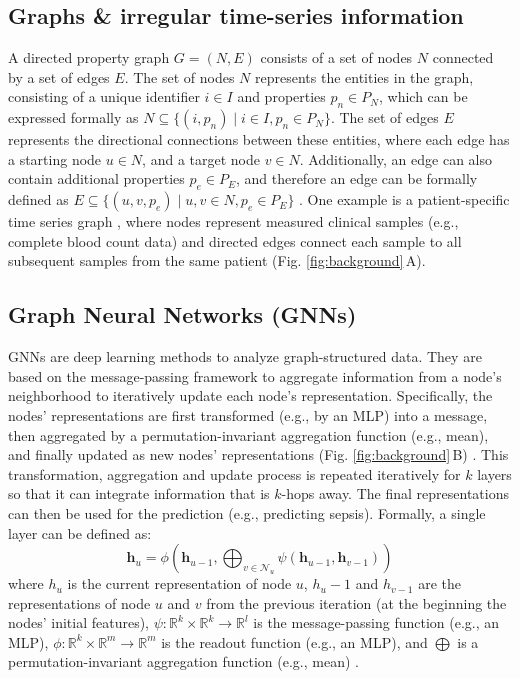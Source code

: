 \documentclass[pdflatex,sn-mathphys-num,lineno]{sn-jnl}
\theoremstyle{thmstyleone}%
\theoremstyle{thmstyletwo}%
\theoremstyle{thmstylethree}%
\begin{document}
\subsection{Graphs \& irregular time-series information}
A directed property graph $G = (N, E)$ consists of a set of nodes $N$ connected by a set of edges $E$. The set of nodes $N$ represents the entities in the graph, consisting of a unique identifier $i \in I$ and properties $p_n \in P_N$, which can be expressed formally as $N \subseteq \{(i, p_n) \mid i \in I, p_n \in P_N\}$. The set of edges $E$ represents the directional connections between these entities, where each edge has a starting node $u \in N$, and a target node $v \in N$. Additionally, an edge can also contain additional properties $p_e \in P_E$, and therefore an edge can be formally defined as $E \subseteq \{(u, v, p_e) \mid u, v \in N, p_e \in P_E\}$ \cite{angles2018property}.
One example is a patient-specific time series graph \cite{walke2023edges}, where nodes represent measured clinical samples (e.g., complete blood count data) and directed edges connect each sample to all subsequent samples from the same patient (Fig. \ref{fig:background}\,A).


\subsection{Graph Neural Networks (GNNs)}
GNNs are deep learning methods to analyze graph-structured data. They are based on the message-passing framework to aggregate information from a node's neighborhood to iteratively update each node's representation. Specifically, the nodes' representations are first transformed  (e.g., by an MLP) into a message, then aggregated by a permutation-invariant aggregation function (e.g., mean), and finally updated as new nodes' representations (Fig. \ref{fig:background}\,B) \cite{Velickovic.22.02.2022}. This transformation, aggregation and update process is repeated iteratively for $k$ layers so that it can integrate information that is $k$-hops away. The final representations can then be used for the prediction (e.g., predicting sepsis). Formally, a single layer can be defined as:
$$
\bm{h}_u = \phi \left( \bm{h}_{u-1}, \bigoplus_{v \in \mathcal{N}_u} \psi(\bm{h}_{u-1}, \bm{h}_{v-1}) \right) 
$$
where $h_u$ is the current representation of node $u$, $h_u-1$ and $h_{v-1}$ are the representations of node $u$ and $v$ from the previous iteration (at the beginning the nodes' initial features), $\psi : \mathbb{R}^k \times \mathbb{R}^k \to \mathbb{R}^l$ is the message-passing function (e.g., an MLP), $\phi : \mathbb{R}^k \times \mathbb{R}^m \to \mathbb{R}^m$ is the readout function (e.g., an MLP), and $\bigoplus$ is a permutation-invariant aggregation function (e.g., mean) \cite{Velickovic.22.02.2022}.
\end{document}
